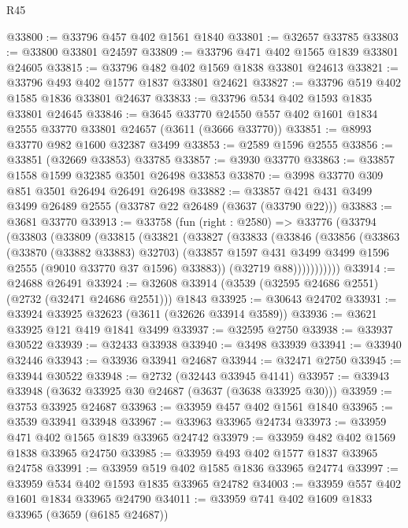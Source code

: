 \begin{lexlean}{R45}
\begin{coremodule}
@33800 := @33796 @457 @402 @1561 @1840
@33801 := @32657 @33785
@33803 := @33800 @33801 @24597
@33809 := @33796 @471 @402 @1565 @1839 @33801 @24605
@33815 := @33796 @482 @402 @1569 @1838 @33801 @24613
@33821 := @33796 @493 @402 @1577 @1837 @33801 @24621
@33827 := @33796 @519 @402 @1585 @1836 @33801 @24637
@33833 := @33796 @534 @402 @1593 @1835 @33801 @24645
@33846 := @3645
    @33770
    @24550
    @557
    @402
    @1601
    @1834
    @2555
    @33770
    @33801
    @24657
    (@3611 (@3666 @33770))
@33851 := @8993 @33770 @982 @1600 @32387 @3499
@33853 := @2589 @1596 @2555
@33856 := @33851 (@32669 @33853) @33785
@33857 := @3930 @33770
@33863 := @33857 @1558 @1599 @32385 @3501 @26498 @33853
@33870 := @3998 @33770 @309 @851 @3501 @26494 @26491 @26498
@33882 := @33857 @421 @431 @3499 @3499 @26489 @2555 (@33787 @22 @26489 (@3637 (@33790 @22)))
@33883 := @3681 @33770
@33913 := @33758
    (fun (right : @2580) =>
    @33776
      (@33794
        (@33803
          (@33809
            (@33815
              (@33821
                (@33827
                  (@33833
                    (@33846
                      (@33856
                        (@33863
                          (@33870 (@33882 @33883) @32703)
                          (@33857
                            @1597
                            @431
                            @3499
                            @3499
                            @1596
                            @2555
                            (@9010 @33770 @37 @1596)
                            @33883))
                        (@32719 @88)))))))))))
@33914 := @24688 @26491
@33924 := @32608 @33914 (@3539 (@32595 @24686 @2551) (@2732 (@32471 @24686 @2551))) @1843
@33925 := @30643 @24702
@33931 := @33924 @33925 @32623 (@3611 (@32626 @33914 @3589))
@33936 := @3621 @33925 @121 @419 @1841 @3499
@33937 := @32595 @2750
@33938 := @33937 @30522
@33939 := @32433 @33938
@33940 := @3498 @33939
@33941 := @33940 @32446
@33943 := @33936 @33941 @24687
@33944 := @32471 @2750
@33945 := @33944 @30522
@33948 := @2732 (@32443 @33945 @4141)
@33957 := @33943 @33948 (@3632 @33925 @30 @24687 (@3637 (@3638 @33925 @30)))
@33959 := @3753 @33925 @24687
@33963 := @33959 @457 @402 @1561 @1840
@33965 := @3539 @33941 @33948
@33967 := @33963 @33965 @24734
@33973 := @33959 @471 @402 @1565 @1839 @33965 @24742
@33979 := @33959 @482 @402 @1569 @1838 @33965 @24750
@33985 := @33959 @493 @402 @1577 @1837 @33965 @24758
@33991 := @33959 @519 @402 @1585 @1836 @33965 @24774
@33997 := @33959 @534 @402 @1593 @1835 @33965 @24782
@34003 := @33959 @557 @402 @1601 @1834 @33965 @24790
@34011 := @33959 @741 @402 @1609 @1833 @33965 (@3659 (@6185 @24687))

\end{coremodule}
\end{lexlean}
